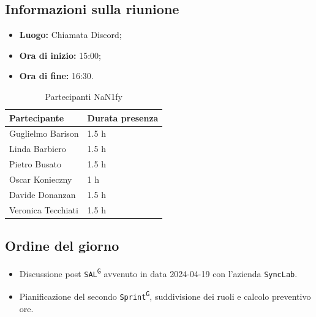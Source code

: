 \documentclass[8pt]{article}
\newcommand{\glossterm}[1]{#1\textsuperscript{G}} %
\begin{document}
\subsection{Informazioni sulla riunione}
\begin{itemize}
	\setlength\itemsep{0em}
	\item\textbf{Luogo:} Chiamata Discord;
	\item\textbf{Ora di inizio:} 15:00;
	\item\textbf{Ora di fine:}  16:30.
\end{itemize}
\begin{table}[ht!]
	\begin{minipage}[t]{0.5\linewidth}
		\centering
		\begin{tabular}{p{3cm} p{3cm}}
			\toprule
			\textbf{Partecipante} & \textbf{Durata presenza} \\
			\midrule
			Guglielmo Barison & 1.5 h \\
			Linda Barbiero &  1.5 h \\
			Pietro Busato & 1.5 h \\
			Oscar Konieczny & 1 h \\
			Davide Donanzan & 1.5 h \\
			Veronica Tecchiati & 1.5 h \\
			\bottomrule
		\end{tabular}
		\caption{Partecipanti NaN1fy}
		\label{table:Partecipanti NaN1fy}
	\end{minipage}
\end{table}
\subsection{Ordine del giorno}
\begin{itemize}
	\setlength\itemsep{0em}
	\item Discussione post \texttt{\glossterm{SAL}} avvenuto in data 2024-04-19 con l'azienda \texttt{SyncLab}.
	\item Pianificazione del secondo \texttt{\glossterm{Sprint}}, suddivisione dei ruoli e calcolo preventivo ore.
\end{itemize}
\end{document}
